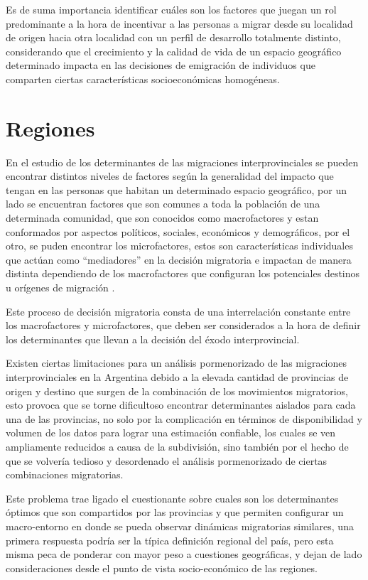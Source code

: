\documentclass[12pt,a4paper]{article}
\begin{document}
Es de suma importancia identificar cuáles son los factores que juegan un rol predominante a la hora de incentivar a las personas a migrar desde su localidad de origen hacia otra localidad con un perfil de desarrollo totalmente distinto,  considerando que el crecimiento y la calidad de vida de un espacio geográfico determinado impacta en las decisiones de emigración de individuos que comparten ciertas características socioeconómicas homogéneas.

\section{Regiones}
En el estudio de los determinantes de las migraciones interprovinciales se pueden encontrar distintos niveles de factores según la generalidad del impacto que tengan en las personas que habitan un determinado espacio geográfico, por un lado se encuentran factores que son comunes a toda la población de una determinada comunidad, que son conocidos como macrofactores y estan conformados por aspectos políticos, sociales, económicos y demográficos, por el otro, se puden encontrar los microfactores, estos son características individuales que actúan como “mediadores” en la decisión migratoria e impactan de manera distinta dependiendo de los macrofactores que configuran los potenciales destinos u orígenes de migración \parencite{kuhnt_literature_2019}.

Este proceso de decisión migratoria consta de una interrelación constante entre los macrofactores y microfactores, que deben ser considerados a la hora de definir los determinantes que llevan a la decisión del éxodo interprovincial.

Existen ciertas limitaciones para un análisis pormenorizado de las migraciones interprovinciales en la Argentina debido a la elevada cantidad de provincias de origen y destino que surgen de la combinación de los movimientos migratorios, esto provoca que se torne dificultoso encontrar determinantes aislados para cada una de las provincias, no solo por la complicación en términos de disponibilidad y volumen de los datos para lograr una estimación confiable, los cuales se ven ampliamente reducidos a causa de la subdivisión, sino también por el hecho de que se volvería tedioso y desordenado el análisis pormenorizado de ciertas combinaciones migratorias.

Este problema trae ligado el cuestionante sobre cuales son los  determinantes óptimos que son compartidos por las  provincias y  que permiten configurar un macro-entorno en donde se pueda  observar dinámicas migratorias similares, una primera respuesta podría ser la típica definición regional del país, pero esta misma peca de ponderar con mayor peso a cuestiones geográficas, y dejan de lado consideraciones desde el punto de vista socio-económico de las regiones.
\end{document}
